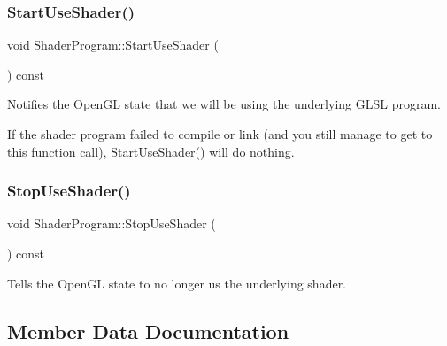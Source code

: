 \subsubsection{\texorpdfstring{Start\+Use\+Shader()}{StartUseShader()}}
{\footnotesize\ttfamily void Shader\+Program\+::\+Start\+Use\+Shader (\begin{DoxyParamCaption}{ }\end{DoxyParamCaption}) const\hspace{0.3cm}{\ttfamily [virtual]}}



Notifies the Open\+GL state that we will be using the underlying G\+L\+SL program. 

If the shader program failed to compile or link (and you still manage to get to this function call), \hyperlink{class_shader_program_aab1241c0f0962d43687d92866d7b7d6a}{Start\+Use\+Shader()} will do nothing. \hypertarget{class_shader_program_a2f2ae9ab4849f855becccfaa445d00d5}{}\label{class_shader_program_a2f2ae9ab4849f855becccfaa445d00d5} 
\subsubsection{\texorpdfstring{Stop\+Use\+Shader()}{StopUseShader()}}
{\footnotesize\ttfamily void Shader\+Program\+::\+Stop\+Use\+Shader (\begin{DoxyParamCaption}{ }\end{DoxyParamCaption}) const\hspace{0.3cm}{\ttfamily [virtual]}}



Tells the Open\+GL state to no longer us the underlying shader. 



\subsection{Member Data Documentation}
\hypertarget{class_shader_program_a8839da24bcba7d96ce590146523a8d47}{}\label{class_shader_program_a8839da24bcba7d96ce590146523a8d47} 
